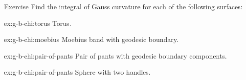 \begin{thm}{Exercise}\label{ex:g-b-chi}
Find the integral of Gauss curvature for each of the following surfaces:

\begin{subthm}{ex:g-b-chi:torus}
Torus.
\end{subthm}

\begin{subthm}{ex:g-b-chi:moebius}
Moebius band with geodesic boundary.
\end{subthm}

\begin{subthm}{ex:g-b-chi:pair-of-pants}
Pair of pants with geodesic boundary components.
\end{subthm}

\begin{subthm}{ex:g-b-chi:pair-of-pants}
Sphere with two handles.
\end{subthm}

\end{thm}

